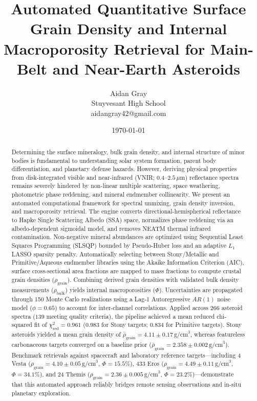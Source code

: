 \documentclass[11pt,a4paper]{article}
\title{\textbf{Automated Quantitative Surface Grain Density and Internal Macroporosity Retrieval for Main-Belt and Near-Earth Asteroids}}
\author{Aidan Gray \\ Stuyvesant High School \\ aidangray42@gmail.com}
\date{\today}
\begin{document}
\maketitle

\begin{abstract}
Determining the surface mineralogy, bulk grain density, and internal structure of minor bodies is fundamental to understanding solar system formation, parent body differentiation, and planetary defense hazards. However, deriving physical properties from disk-integrated visible and near-infrared (VNIR; $0.4$--$2.5\,\mu\text{m}$) reflectance spectra remains severely hindered by non-linear multiple scattering, space weathering, photometric phase reddening, and mineral endmember collinearity. We present an automated computational framework for spectral unmixing, grain density inversion, and macroporosity retrieval. The engine converts directional-hemispherical reflectance to Hapke Single Scattering Albedo (SSA) space, normalizes phase reddening via an albedo-dependent sigmoidal model, and removes NEATM thermal infrared contamination. Non-negative mineral abundances are optimized using Sequential Least Squares Programming (SLSQP) bounded by Pseudo-Huber loss and an adaptive $L_1$ LASSO sparsity penalty. Automatically selecting between Stony/Metallic and Primitive/Aqueous endmember libraries using the Akaike Information Criterion (AIC), surface cross-sectional area fractions are mapped to mass fractions to compute crustal grain densities ($\rho_{\text{grain}}$). Combining derived grain densities with validated bulk density measurements ($\rho_{\text{bulk}}$) yields internal macroporosities ($\Phi$). Uncertainties are propagated through 150 Monte Carlo realizations using a Lag-1 Autoregressive $AR(1)$ noise model ($\phi = 0.65$) to account for inter-channel correlations. Applied across 266 asteroid spectra ($139$ meeting quality criteria), the pipeline achieved a mean reduced chi-squared fit of $\chi^2_{\text{red}} = 0.961$ ($0.983$ for Stony targets; $0.834$ for Primitive targets). Stony asteroids yielded a mean grain density of $\bar{\rho}_{\text{grain}} = 4.11 \pm 0.17\,\text{g/cm}^3$, whereas featureless carbonaceous targets converged on a baseline prior ($\bar{\rho}_{\text{grain}} = 2.358 \pm 0.002\,\text{g/cm}^3$). Benchmark retrievals against spacecraft and laboratory reference targets—including 4 Vesta ($\rho_{\text{grain}} = 4.10 \pm 0.05\,\text{g/cm}^3$, $\Phi = 15.5\%$), 433 Eros ($\rho_{\text{grain}} = 4.49 \pm 0.11\,\text{g/cm}^3$, $\Phi = 34.1\%$), and 24 Themis ($\rho_{\text{grain}} = 2.36 \pm 0.005\,\text{g/cm}^3$, $\Phi = 23.2\%$)—demonstrate that this automated approach reliably bridges remote sensing observations and in-situ planetary exploration.
\end{abstract}
\end{document}
